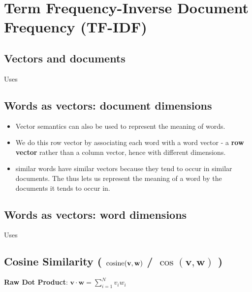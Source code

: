 \chapter{Term Frequency-Inverse Document Frequency (TF-IDF) \cite{nlp-1, ir-1}} \label{Term Frequancy-Inverse Document Frequency (TF-IDF)}


\section{Vectors and documents \cite{nlp-1}}\label{tf-idf: Vectors and documents}
Uses 


\section{Words as vectors: document dimensions \cite{nlp-1}}\label{tf-idf: Words as vectors: document dimensions}

\begin{itemize}
    \item Vector semantics can also be used to represent the meaning of words. 

    \item We do this row vector by associating each word with a word vector - a \textbf{row vector} rather than a column vector, hence with different dimensions.

    \item similar words have similar vectors because they tend to occur in similar documents. The  thus lets us represent the meaning of a word by the documents it tends to occur in.
\end{itemize}


\section{Words as vectors: word dimensions \cite{nlp-1}} \label{tf-idf: Words as vectors: word dimensions}

Uses 



\section{Cosine Similarity ( $\operatorname{cosine}(\mathbf{v,w})$ / $\cos(\mathbf{v,w})$ ) \cite{nlp-1}}\label{Cosine Similarity}

\textbf{Raw Dot Product}: \( \displaystyle\mathbf{v \cdot w} = \sum_{i=1}^{N} v_i w_i \)

